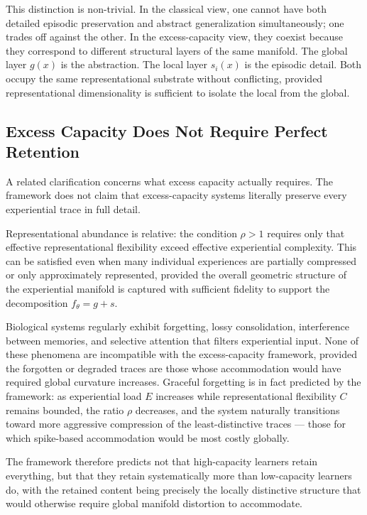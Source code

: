 \documentclass[12pt,a4paper]{article}
\begin{document}
This distinction is non-trivial. In the classical view, one cannot have both detailed episodic preservation and abstract generalization simultaneously; one trades off against the other. In the excess-capacity view, they coexist because they correspond to different structural layers of the same manifold. The global layer $g(x)$ is the abstraction. The local layer $s_i(x)$ is the episodic detail. Both occupy the same representational substrate without conflicting, provided representational dimensionality is sufficient to isolate the local from the global.

\subsection{Excess Capacity Does Not Require Perfect Retention}

A related clarification concerns what excess capacity actually requires. The framework does not claim that excess-capacity systems literally preserve every experiential trace in full detail.

Representational abundance is relative: the condition $\rho > 1$ requires only that effective representational flexibility exceed effective experiential complexity. This can be satisfied even when many individual experiences are partially compressed or only approximately represented, provided the overall geometric structure of the experiential manifold is captured with sufficient fidelity to support the decomposition $f_\theta = g + s$.

Biological systems regularly exhibit forgetting, lossy consolidation, interference between memories, and selective attention that filters experiential input. None of these phenomena are incompatible with the excess-capacity framework, provided the forgotten or degraded traces are those whose accommodation would have required global curvature increases. Graceful forgetting is in fact predicted by the framework: as experiential load $E$ increases while representational flexibility $C$ remains bounded, the ratio $\rho$ decreases, and the system naturally transitions toward more aggressive compression of the least-distinctive traces --- those for which spike-based accommodation would be most costly globally.

The framework therefore predicts not that high-capacity learners retain everything, but that they retain systematically more than low-capacity learners do, with the retained content being precisely the locally distinctive structure that would otherwise require global manifold distortion to accommodate.
\end{document}
